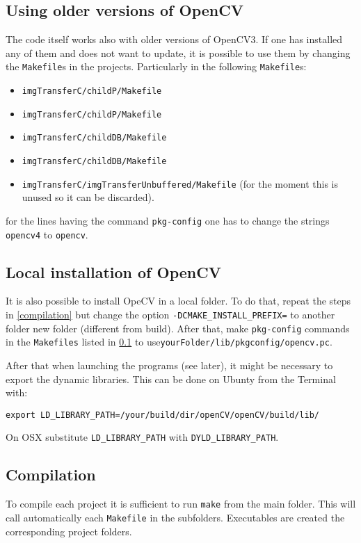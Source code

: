 \documentclass[12pt, letterpaper]{article}
\theoremstyle{definition}
\let\cd\lstinline
\begin{document}
\subsection{Using older versions of OpenCV}
\label{olderOpenCV}
The code itself works also with older versions of OpenCV3. If one has installed any of them and does not want to update, it is possible to use them by changing the \lstinline+Makefile+s in the projects. Particularly in the following \lstinline+Makefile+s:
\begin{itemize}
\item \lstinline+imgTransferC/childP/Makefile+
\item \lstinline+imgTransferC/childP/Makefile+
\item \lstinline+imgTransferC/childDB/Makefile+
\item \lstinline+imgTransferC/childDB/Makefile+
\item \lstinline+imgTransferC/imgTransferUnbuffered/Makefile+ (for the moment this is unused so it can be discarded).
\end{itemize}
for the lines having the command \lstinline+pkg-config+ one has to change the strings \lstinline+opencv4+ to \lstinline+opencv+.

\subsection{Local installation of OpenCV}
It is also possible to install OpeCV in a local folder. To do that, repeat the steps in \ref{compilation} but change the option \lstinline+-DCMAKE_INSTALL_PREFIX=+ to another folder new folder (different from build). After that, make \lstinline+pkg-config+ commands in the  \lstinline+Makefiles+ listed in \ref{olderOpenCV} to use\lstinline+yourFolder/lib/pkgconfig/opencv.pc+.

After that when launching the programs (see later), it might be necessary to export the dynamic libraries. This can be done on Ubunty from the Terminal with:
\begin{lstlisting}
export LD_LIBRARY_PATH=/your/build/dir/openCV/openCV/build/lib/
\end{lstlisting}
On OSX substitute  \lstinline+LD_LIBRARY_PATH+ with \lstinline+DYLD_LIBRARY_PATH+.


\subsection{Compilation}
To compile each project it is sufficient to run \cd+make+ from the main folder. This will call automatically each \cd+Makefile+ in the  subfolders. Executables are created the corresponding project folders.
\end{document}
